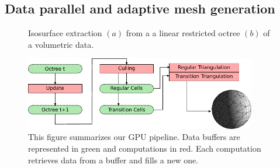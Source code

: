 \documentclass{llncs}
\begin{document}

\subsection{Data parallel and adaptive mesh generation}






\begin{figure}[!htbp]
\centering
{}
\caption{Isosurface extraction $(a)$ from a  a linear restricted octree
  $(b)$ of a volumetric data.\label{fig:isoexample}}
\end{figure}



\begin{figure}[!htbp]
  \centering
  \includegraphics[width=0.9\textwidth]{figs/pipeline}
  \caption{ This figure summarizes our GPU pipeline. Data buffers are
    represented in green and computations in red. Each computation
    retrieves data from a buffer and fills a new one. }
  \label{fig_pipeline} 
\end{figure}
\end{document}
